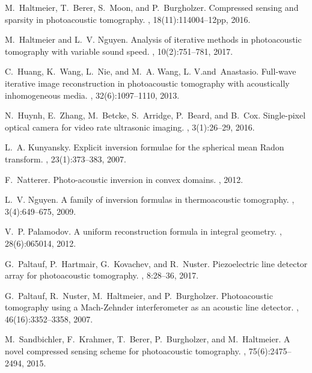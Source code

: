\documentclass[11pt]{article}
\begin{document}
\begin{thebibliography}{10}
	M.~Haltmeier, T.~Berer, S.~Moon, and P.~Burgholzer.
	\newblock Compressed sensing and sparsity in photoacoustic tomography.
	, 18(11):114004--12pp, 2016.
	
	M.~Haltmeier and L.~V. Nguyen.
	\newblock Analysis of iterative methods in photoacoustic tomography with
	variable sound speed.
	, 10(2):751--781, 2017.
	
	C.~Huang, K.~Wang, L.~Nie, and M.~A. Wang, L. V.and~Anastasio.
	\newblock Full-wave iterative image reconstruction in photoacoustic tomography
	with acoustically inhomogeneous media.
	, 32(6):1097--1110, 2013.
	
	N.~Huynh, E.~Zhang, M.~Betcke, S.~Arridge, P.~Beard, and B.~Cox.
	\newblock Single-pixel optical camera for video rate ultrasonic imaging.
	, 3(1):26--29, 2016.
	
	L.~A. Kunyansky.
	\newblock Explicit inversion formulae for the spherical mean {R}adon transform.
	, 23(1):373--383, 2007.
	
	F.~Natterer.
	\newblock Photo-acoustic inversion in convex domains.
	, 2012.
	
	L.~V. Nguyen.
	\newblock A family of inversion formulas in thermoacoustic tomography.
	, 3(4):649--675, 2009.
	
	V.~P. Palamodov.
	\newblock A uniform reconstruction formula in integral geometry.
	, 28(6):065014, 2012.
	
	G.~Paltauf, P.~Hartmair, G.~Kovachev, and R.~Nuster.
	\newblock Piezoelectric line detector array for photoacoustic tomography.
	, 8:28--36, 2017.
	
	G.~Paltauf, R.~Nuster, M.~Haltmeier, and P.~Burgholzer.
	\newblock Photoacoustic tomography using a {M}ach-{Z}ehnder interferometer as
	an acoustic line detector.
	, 46(16):3352--3358, 2007.
	
	M.~Sandbichler, F.~Krahmer, T.~Berer, P.~Burgholzer, and M.~Haltmeier.
	\newblock A novel compressed sensing scheme for photoacoustic tomography.
	, 75(6):2475--2494, 2015.
	

\end{thebibliography}
\end{document}
